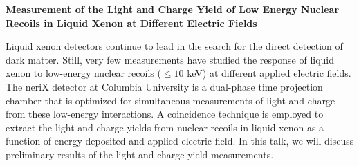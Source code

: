 \documentclass[12pt,a4paper]{article}
\begin{document}
\begin{center}
\textbf{Measurement of the Light and Charge Yield of Low Energy Nuclear Recoils in Liquid Xenon at Different Electric Fields}

Liquid xenon detectors continue to lead in the search for the direct detection of dark matter.  Still, very few measurements have studied the response of liquid xenon to low-energy nuclear recoils ($\leq 10$ keV) at different applied electric fields.  The neriX detector at Columbia University is a dual-phase time projection chamber that is optimized for simultaneous measurements of light and charge from these low-energy interactions.  A coincidence technique is employed to extract the light and charge yields from nuclear recoils in liquid xenon as a function of energy deposited and applied electric field.  In this talk, we will discuss preliminary results of the light and charge yield measurements.
\end{center}
\end{document}
